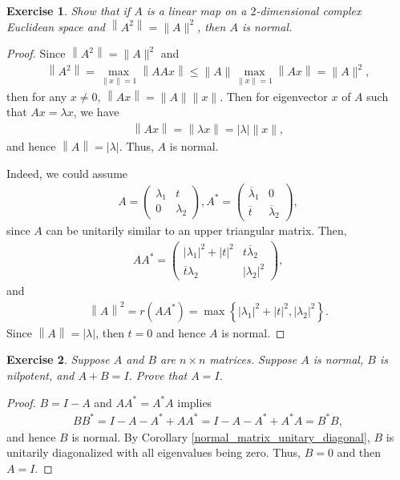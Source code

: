\documentclass[11pt]{book}
\newtheorem{exercise}{Exercise}[section]
\theoremstyle{definition}
\numberwithin{equation}{chapter}
\begin{document}
\begin{exercise}
Show that if $A$ is a linear map on a $2$-dimensional complex Euclidean space and $\left\|A^2\right\| = \|A\|^2$, then $A$ is normal.
\end{exercise}
\begin{proof}
Since $\left\|A^2\right\| = \|A\|^2$ and
\begin{align*}
    \left\|A^2\right\| = \max_{\|x\| = 1} \left\|AAx\right\| \leq \|A\| \max_{\|x\| = 1} \left\|Ax\right\| = \|A\|^2,
\end{align*}
then for any $x \neq 0$, $\left\|Ax\right\| = \|A\| \|x\|$. Then for eigenvector $x$ of $A$ such that $Ax = \lambda x$, we have
\begin{align*}
    \left\|Ax\right\| = \left\|\lambda x\right\| = |\lambda| \|x\|,
\end{align*}
and hence $\left\|A\right\| = |\lambda|$. Thus, $A$ is normal.

Indeed, we could assume
\begin{align*}
    A = \begin{pmatrix}
        \lambda_1 & t \\
        0 & \lambda_2
    \end{pmatrix},
    A^* = \begin{pmatrix}
        \overline{\lambda}_1 & 0 \\
        \overline{t} & \overline{\lambda}_2
    \end{pmatrix},
\end{align*}
since $A$ can be unitarily similar to an upper triangular matrix. Then,
\begin{align*}
    A A^* = \begin{pmatrix}
        \left|\lambda_1\right|^2 + |t|^2 & t \overline{\lambda}_2 \\
        \overline{t} \lambda_2 & \left|\lambda_2\right|^2
    \end{pmatrix},
\end{align*}
and 
\begin{align*}
    \left\|A\right\|^2 = r\left(A A^*\right) = \max \left\{ \left|\lambda_1\right|^2 + |t|^2, \left|\lambda_2\right|^2 \right\}.
\end{align*}
Since $\left\|A\right\| = |\lambda|$, then $t = 0$ and hence $A$ is normal.
\end{proof}

\medskip

\begin{exercise}
Suppose $A$ and $B$ are $n \times n$ matrices. Suppose $A$ is normal, $B$ is nilpotent, and $A + B = I$. Prove that $A = I$.
\end{exercise}
\begin{proof}
$B = I - A$ and $A A^* = A^* A$ implies
\begin{align*}
    BB^* = I - A - A^* + A A^* = I - A - A^* + A^* A = B^*B,
\end{align*}
and hence $B$ is normal. By Corollary \ref{normal_matrix_unitary_diagonal}, $B$ is unitarily diagonalized with all eigenvalues being zero. Thus, $B = 0$ and then $A = I$.
\end{proof}
\end{document}
